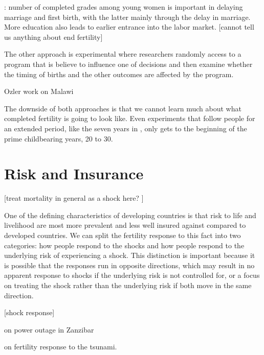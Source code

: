 \documentclass[letterpaper,12pt]{article}
\begin{document}
\citet{Marchetta2016}: number of completed grades among young women is
important in delaying marriage and first birth, with the latter mainly
through the delay in marriage.
More education also leads to earlier entrance into the labor market.
[cannot tell us anything about end fertility]

The other approach is experimental where researchers randomly access
to a program that is believe to influence one of decisions 
and then examine whether the timing of births and the other outcomes 
are affected by the program.


\citet{Duflo2015}

\citet{Dupas2017}

Ozler work on Malawi


The downside of both approaches is that we cannot learn
much about what completed fertility is going to look like.
Even experiments that follow people for an extended period,
like the seven years in \citet{Duflo2015}, only gets to
the beginning of the prime childbearing years, 20 to 30.


\citet{wolpin84}

\section{Risk and Insurance}

[treat mortality in general as a shock here? \citet{olsen80}]

One of the defining characteristics of developing
countries is that risk to life and livelihood are 
most more prevalent and less well insured against
compared to developed countries.
We can split the fertility response to this fact
into two categories: how people respond to the
shocks and how people respond to the underlying
risk of experiencing a shock.
This distinction is important because it is possible 
that the responses run in opposite directions, which
may result in no apparent response to shocks if the
underlying risk is not controlled for, or a focus
on treating the shock rather than the underlying
risk if both move in the same direction.


[shock response]

\citet{Hernandez-Julian2014}

\citet{Burlando2014} on power outage in Zanzibar

\citep{Nobles2015} on fertility response to 
the tsunami.

\citep{Alam2016}

\citet{pitt98b}
\end{document}
